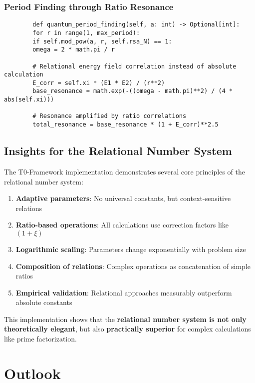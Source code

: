 \documentclass[11pt,a4paper]{article}
\begin{document}
	\subsubsection{Period Finding through Ratio Resonance}
	\begin{verbatim}
		def quantum_period_finding(self, a: int) -> Optional[int]:
		for r in range(1, max_period):
		if self.mod_pow(a, r, self.rsa_N) == 1:
		omega = 2 * math.pi / r
		
		# Relational energy field correlation instead of absolute calculation
		E_corr = self.xi * (E1 * E2) / (r**2)
		base_resonance = math.exp(-((omega - math.pi)**2) / (4 * abs(self.xi)))
		
		# Resonance amplified by ratio correlations
		total_resonance = base_resonance * (1 + E_corr)**2.5
	\end{verbatim}
	
	\subsection{Insights for the Relational Number System}
	
	The T0-Framework implementation demonstrates several core principles of the relational number system:
	
	\begin{enumerate}
		\item \textbf{Adaptive parameters}: No universal constants, but context-sensitive relations
		\item \textbf{Ratio-based operations}: All calculations use correction factors like $(1 + \xi)$
		\item \textbf{Logarithmic scaling}: Parameters change exponentially with problem size
		\item \textbf{Composition of relations}: Complex operations as concatenation of simple ratios
		\item \textbf{Empirical validation}: Relational approaches measurably outperform absolute constants
	\end{enumerate}
	
	This implementation shows that the \textbf{relational number system is not only theoretically elegant}, but also \textbf{practically superior} for complex calculations like prime factorization.
	
	\section{Outlook}
	
\end{document}
